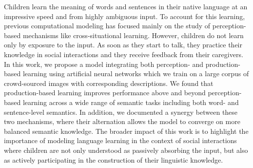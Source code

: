 Children learn the meaning of words and sentences in their native language at an impressive speed and from  highly ambiguous input. To account for this learning, previous computational modeling has focused mainly on the study of perception-based mechanisms like cross-situational learning. However, children do not learn only by exposure to the input. As soon as they start to talk, they practice their knowledge in social interactions and they receive feedback from their caregivers. In this work, we propose a model integrating both perception- and production-based learning using artificial neural networks which we train on a large corpus of crowd-sourced images with corresponding descriptions. We found that production-based learning improves performance above and beyond perception-based learning across a wide range of semantic tasks including both word- and sentence-level semantics. In addition, we documented a synergy between these two mechanisms, where their alternation allows the model to converge on more balanced semantic knowledge. The broader impact of this work is to highlight the importance of modeling language learning in the context of social interactions where children are not only understood as passively absorbing the input, but also as actively participating in the construction of their linguistic knowledge.
